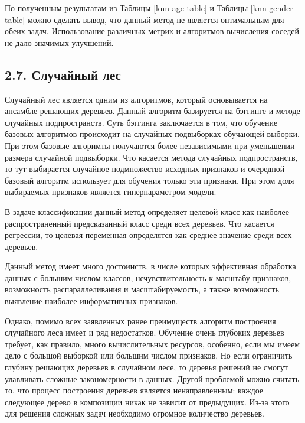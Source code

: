 По полученным результатам из Таблицы \ref{knn age table} и  Таблицы \ref{knn gender table} можно сделать вывод, что данный метод не является оптимальным для обеих задач. Использование различных метрик и алгоритмов вычисления соседей не дало значимых улучшений. 

\subsection{2.7. Случайный лес}
Случайный лес \cite{random forest} является одним из алгоритмов, который основывается на ансамбле решающих деревьев. Данный алгоритм базируется на бэггинге и методе случайных подпространств. Суть бэггинга заключается в том, что обучение базовых алгоритмов происходит на случайных подвыборках обучающей выборки. При этом базовые алгоримты получаются более независимыми при уменьшении размера случайной подвыборки. Что касается метода случайных подпространств, то тут выбирается случайное подмножество исходных признаков и очередной базовый алгоритм использует для обучения только эти признаки. При этом доля выбираемых признаков является гиперпараметром модели.

В задаче классификации данный метод определяет целевой класс как наиболее распространенный предсказанный класс среди всех деревьев. Что касается регрессии, то целевая переменная определятся как среднее значение среди всех деревьев.  

Данный метод имеет много достоинств, в числе которых эффективная обработка данных с большим числом классов, нечувствительность к масштабу признаков, возможность распараллеливания и масштабируемость, а также возможность выявление наиболее информативных признаков. 

Однако, помимо всех заявленных ранее преимуществ алгоритм построения случайного леса имеет и ряд недостатков. Обучение очень глубоких деревьев требует, как правило, много вычислительных ресурсов,
особенно, если мы имеем дело с большой выборкой или большим числом признаков. Но если ограничить глубину решающих деревьев в случайном лесе, то деревья решений не смогут улавливать сложные
закономерности в данных. Другой проблемой можно считать то, что процесс построения деревьев является ненаправленным: каждое следующее дерево в композиции никак не зависит от предыдущих. Из-за этого для решения сложных задач необходимо огромное количество деревьев. 

